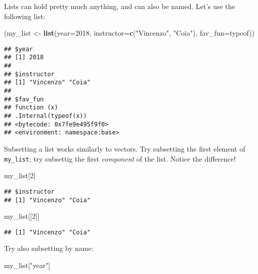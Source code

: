 \documentclass[]{article}
\newenvironment{Shaded}{\begin{snugshade}}{\end{snugshade}}
\newcommand{\KeywordTok}[1]{\textcolor[rgb]{0.13,0.29,0.53}{\textbf{#1}}}
\newcommand{\DataTypeTok}[1]{\textcolor[rgb]{0.13,0.29,0.53}{#1}}
\newcommand{\DecValTok}[1]{\textcolor[rgb]{0.00,0.00,0.81}{#1}}
\newcommand{\StringTok}[1]{\textcolor[rgb]{0.31,0.60,0.02}{#1}}
\newcommand{\NormalTok}[1]{#1}
\begin{document}
Lists can hold pretty much anything, and can also be named. Let's use
the following list:

\begin{Shaded}
\begin{Highlighting}[]
\NormalTok{(my_list <-}\StringTok{ }\KeywordTok{list}\NormalTok{(}\DataTypeTok{year=}\DecValTok{2018}\NormalTok{, }\DataTypeTok{instructor=}\KeywordTok{c}\NormalTok{(}\StringTok{"Vincenzo"}\NormalTok{, }\StringTok{"Coia"}\NormalTok{), }\DataTypeTok{fav_fun=}\NormalTok{typeof))}
\end{Highlighting}
\end{Shaded}

\begin{verbatim}
## $year
## [1] 2018
## 
## $instructor
## [1] "Vincenzo" "Coia"    
## 
## $fav_fun
## function (x) 
## .Internal(typeof(x))
## <bytecode: 0x7fe9e495f9f0>
## <environment: namespace:base>
\end{verbatim}

Subsetting a list works similarly to vectors. Try subsetting the first
element of \texttt{my\_list}; try subsettig the first \emph{component}
of the list. Notice the difference!

\begin{Shaded}
\begin{Highlighting}[]
\NormalTok{my_list[}\DecValTok{2}\NormalTok{]}
\end{Highlighting}
\end{Shaded}

\begin{verbatim}
## $instructor
## [1] "Vincenzo" "Coia"
\end{verbatim}

\begin{Shaded}
\begin{Highlighting}[]
\NormalTok{my_list[[}\DecValTok{2}\NormalTok{]]}
\end{Highlighting}
\end{Shaded}

\begin{verbatim}
## [1] "Vincenzo" "Coia"
\end{verbatim}

Try also subsetting by name:

\begin{Shaded}
\begin{Highlighting}[]
\NormalTok{my_list[}\StringTok{"year"}\NormalTok{]}
\end{Highlighting}
\end{Shaded}
\end{document}
